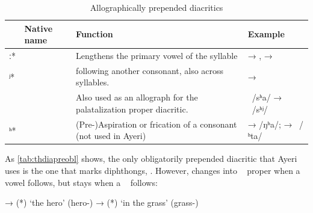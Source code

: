 
\begin{table}[tp]
\caption{Allographically prepended diacritics}
\begin{tabu} to 
\toprule
\tableheaderfont

	& Native name
	& Function
	& Example
	\\
	
\toprule

ː*
	& 
	& Lengthens the primary vowel of the syllable
	&  → ,\newline
		 → 
	\\
	
\midrule

ʲ*
	& 
	&  following another consonant, also across syllables.
	&  → 
	\\
	
	
	& 
	& Also used as an allograph for the palatalization proper diacritic.
	& ~/sʰa/ → ~/sʰʲ/
	\\
	
\midrule

ʰ*
	& 
	& (Pre-)Aspiration or frication of a consonant (not used in Ayeri)
	&  →  /ŋʰa/;\newline
		 → ~/ʰta/
	\\

\bottomrule
\end{tabu}
\label{tab:thdiapreallo}
\end{table}

As \autoref{tab:thdiapreobl} shows, the only obligatorily prepended diacritic
that Ayeri uses is the one that marks diphthongs, .
However,  changes into ~ proper when a vowel follows,
but stays  when a ~ follows:

\pex
	\a {} → 
		 (*) 
		`the hero' (hero-\Aarg{})
	\a {} → 
		 (*)  `in 
		the grass' (grass-\Loc{})
\xe

